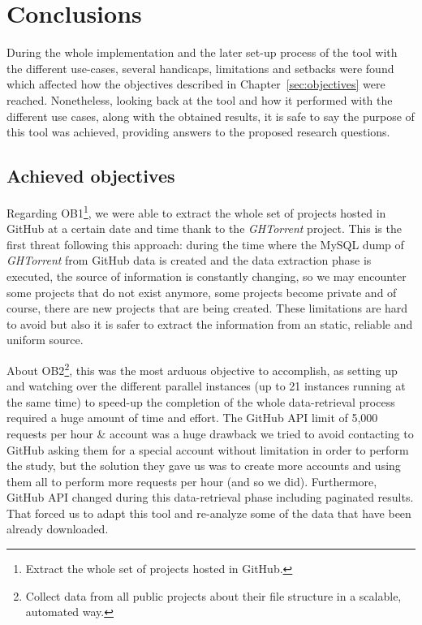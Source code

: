 \documentclass[a4paper, 12pt]{book}
\begin{document}
\chapter{Conclusions}
\label{sec:conclusions}

During the whole implementation and the later set-up process of the tool with the different use-cases,
several handicaps, limitations and setbacks were found which affected how the objectives described
in Chapter~\ref{sec:objectives} were reached. Nonetheless, looking back at the tool and how
it performed with the different use cases, along with the obtained results, it is safe to
say the purpose of this tool was achieved, providing answers to the proposed research questions.
\section{Achieved objectives}
\label{sec:achieved-objectives}

Regarding OB1\footnote{Extract the whole set of projects hosted in GitHub.},
we were able to extract the whole set of projects hosted in GitHub at
a certain date and time thank to the \emph{GHTorrent} project. This is the first threat
following this approach: during the time where the MySQL dump of \emph{GHTorrent} from GitHub data is created
and the data extraction phase is executed, the source of information is constantly changing,
so we may encounter some projects that do not exist anymore, some projects become private
and of course, there are new projects that are being created. These limitations are hard
to avoid but also it is safer to extract the information from an static, reliable and uniform source.

About OB2\footnote{Collect data from all public projects about their file structure in a scalable, automated way.},
this was the most arduous objective to accomplish, as setting up and watching over
the different parallel instances (up to 21 instances running at the same time) to speed-up the completion
of the whole data-retrieval process required a huge amount of time and effort. The GitHub API limit of
5,000 requests per hour \& account was a huge drawback we tried to avoid contacting to GitHub asking them for a special
account without limitation in order to perform the study, but the solution they gave us was to create more accounts
and using them all to perform more requests per hour (and so we did). Furthermore, GitHub API changed during this
data-retrieval phase including paginated results. That forced us to adapt this tool and re-analyze some of the data
that have been already downloaded.
\end{document}
